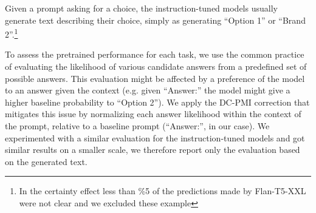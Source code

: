 Given a prompt asking for a choice, the instruction-tuned models usually generate text describing their choice, simply as generating ``Option 1'' or ``Brand 2''.\footnote{In the certainty effect less than \%5 of the predictions made by Flan-T5-XXL were not clear and we excluded these example}

To assess the pretrained performance for each task, we use the common practice \cite{NEURIPS2020_1457c0d6} of evaluating the likelihood of various candidate answers from a predefined set of possible answers. 
This evaluation might be affected by a preference of the model to an answer given the context (e.g. given ``Answer:'' the model might give a higher baseline probability to ``Option 2'').
We apply the DC-PMI correction \cite{holtzman-etal-2021-surface} that mitigates this issue by normalizing each answer likelihood within the context of the prompt, relative to a baseline prompt (``Answer:'', in our case).
We experimented with a similar evaluation for the instruction-tuned models and got similar results on a smaller scale, we therefore report only the evaluation based on the generated text.





